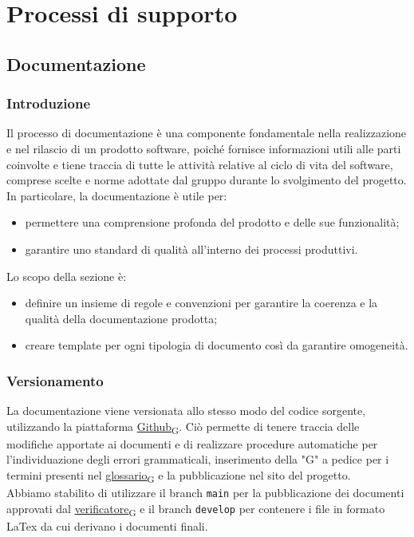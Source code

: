 \section{Processi di supporto}
\subsection{Documentazione}
\subsubsection{Introduzione}
Il processo di documentazione è una componente fondamentale nella realizzazione e nel rilascio di un prodotto software,
poiché fornisce informazioni utili alle parti coinvolte e tiene traccia di tutte le attività relative al ciclo di vita del software,
comprese scelte e norme adottate dal gruppo durante lo svolgimento del progetto. In particolare, la documentazione è utile per:
\begin{itemize}
	\item permettere una comprensione profonda del prodotto e delle sue funzionalità;
	\item garantire uno standard di qualità all'interno dei processi produttivi.
\end{itemize}
Lo scopo della sezione è:
\begin{itemize}
	\item definire un insieme di regole e convenzioni per garantire la coerenza e la qualità della documentazione prodotta;
	\item creare template per ogni tipologia di documento così da garantire omogeneità.
\end{itemize}

\subsubsection{Versionamento}
La documentazione viene versionata allo stesso modo del codice sorgente, utilizzando la piattaforma \href{https://7last.github.io/docs/rtb/documentazione-interna/glossario\#github}{Github\textsubscript{G}}.
Ciò permette di tenere traccia delle modifiche apportate ai documenti e di realizzare procedure automatiche per l'individuazione degli errori grammaticali,
inserimento della "G" a pedice per i termini presenti nel \href{https://7last.github.io/docs/rtb/documentazione-interna/glossario\#glossario}{glossario\textsubscript{G}} e la pubblicazione nel sito del progetto.\\
Abbiamo stabilito di utilizzare il branch \texttt{main} per la pubblicazione dei documenti approvati dal \href{https://7last.github.io/docs/rtb/documentazione-interna/glossario\#verificatore}{verificatore\textsubscript{G}} e il branch \texttt{develop} per contenere
i file in formato LaTex da cui derivano i documenti finali.

